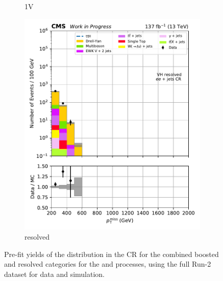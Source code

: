 \begin{figure}[htbp]
\begin{subfigure}[b]{0.24\textwidth}
        \caption{\VH 1V}
    \end{subfigure}
    \hfill
    \begin{subfigure}[b]{0.24\textwidth}
        \includegraphics[width=\textwidth]{figures/region_plots/full_Run2/region_4/VH_resolved.pdf}
        \caption{\VH resolved}
    \end{subfigure}
    \caption[Pre-fit yields of the \ptmiss distribution in the \doubleEleCr control region for the combined boosted and resolved categories for the \ttH and \VH processes, using the full Run-2 dataset for data and simulation]{Pre-fit yields of the \ptmiss distribution in the \doubleEleCr \gls{CR} for the combined boosted and resolved categories for the \ttH and \VH processes, using the full Run-2 dataset for data and simulation.}
    \label{fig:htoinv_cr_yields_comb2016to18_double_electron}
\end{figure}

